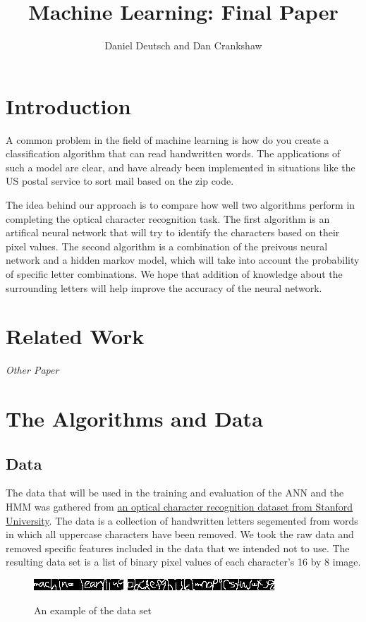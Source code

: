 \documentclass[11pt,a4paper,twocolumn]{article}
\author{Daniel Deutsch and Dan Crankshaw}
\title{Machine Learning: Final Paper}
\date{}
\begin{document}
\maketitle

\section{Introduction}

A common problem in the field of machine learning is how do you create a classification algorithm that can read handwritten words. The applications of such a model are clear, and have already been implemented in situations like the US postal service to sort mail based on the zip code. 

The idea behind our approach is to compare how well two algorithms perform in completing the optical character recognition task. The first algorithm is an artifical neural network that will try to identify the characters based on their pixel values. The second algorithm is a combination of the preivous neural network and a hidden markov model, which will take into account the probability of specific letter combinations. We hope that addition of knowledge about the surrounding letters will help improve the accuracy of the neural network.

\section{Related Work}

\emph{Other Paper} \cite{feng2008hidden}

\section{The Algorithms and Data}

\subsection*{Data}

The data that will be used in the training and evaluation of the ANN and the HMM was gathered from
\href{http://ai.stanford.edu/~btaskar/ocr/}{an optical character recognition dataset from Stanford University}. The data is a collection of handwritten letters segemented from words in which all uppercase characters have been removed. We took the raw data and removed specific features included in the data that we intended not to use. The resulting data set is a list of binary pixel values of each character's 16 by 8 image.
\begin{figure}[h]
\centering
\includegraphics{img/ml.jpg}
\includegraphics{img/alphabet.jpg}
\caption{An example of the data set}
\end{figure}
\end{document}
